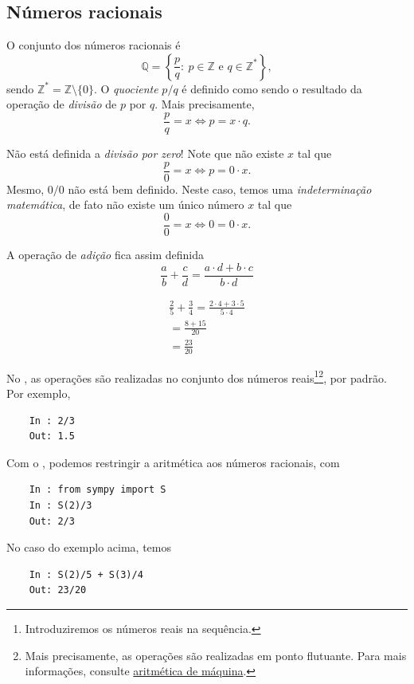 \subsection{Números racionais}

O conjunto dos números racionais é
\begin{equation}
  \mathbb{Q} = \left\{\frac{p}{q}:~p\in\mathbb{Z}\text{ e }q\in\mathbb{Z}^*\right\},
\end{equation}
sendo $\mathbb{Z}^*=\mathbb{Z}\setminus\{0\}$. O \emph{quociente} $p/q$ é definido como sendo o resultado da operação de \emph{divisão} de $p$ por $q$. Mais precisamente,
\begin{equation}
  \frac{p}{q} = x \Leftrightarrow p = x\cdot q.
\end{equation}

\begin{obs}
  Não está definida a \emph{divisão por zero}! Note que não existe $x$ tal que
  \begin{equation}
    \frac{p}{0} = x \Leftrightarrow p = 0\cdot x.
  \end{equation}
  Mesmo, $0/0$ não está bem definido. Neste caso, temos uma \emph{indeterminação matemática}, de fato não existe um único número $x$ tal que
  \begin{equation}
    \frac{0}{0} = x \Leftrightarrow 0 = 0\cdot x.
  \end{equation}
\end{obs}

A operação de \emph{adição} fica assim definida
\begin{equation}
  \frac{a}{b} + \frac{c}{d} = \frac{a\cdot d + b\cdot c}{b\cdot d}
\end{equation}

\begin{ex}
  \begin{gather}
    \frac{2}{5} + \frac{3}{4} = \frac{2\cdot 4 + 3\cdot 5}{5\cdot 4} \\
    = \frac{8 + 15}{20} \\
    = \frac{23}{20}
  \end{gather}

  \ifispython
  No \python, as operações são realizadas no conjunto dos números reais\footnote{Introduziremos os números reais na sequência.}\footnote{Mais precisamente, as operações são realizadas em ponto flutuante. Para mais informações, consulte \href{https://phkonzen.github.io/notas/MatematicaNumerica/cap_aritm.html}{aritmética de máquina}.}, por padrão. Por exemplo,
  \begin{lstlisting}
    In : 2/3
    Out: 1.5
  \end{lstlisting}
  Com o \sympy, podemos restringir a aritmética aos números racionais, com
  \begin{lstlisting}
    In : from sympy import S
    In : S(2)/3
    Out: 2/3
  \end{lstlisting}
  No caso do exemplo acima, temos
  \begin{lstlisting}
    In : S(2)/5 + S(3)/4
    Out: 23/20
  \end{lstlisting}
  \fi
\end{ex}

